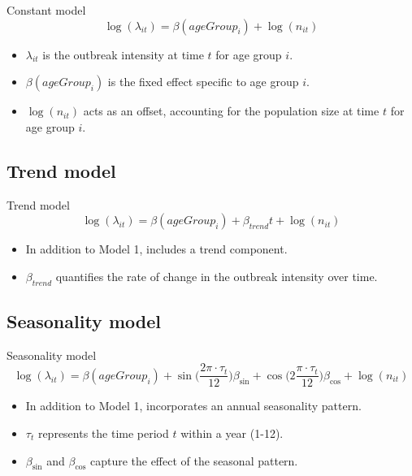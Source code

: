 \documentclass[aspectratio=169]{beamer}
\begin{document}
\begin{frame}{Constant model}
\begin{equation}\label{eq:Agegroup}
  \log(\lambda_{it}) = \beta(ageGroup_{i}) + \log(n_{it})
\end{equation}

\begin{itemize}
  \item $\lambda_{it}$ is the outbreak intensity at time $t$ for age group $i$.
  \item $\beta(ageGroup_{i})$ is the fixed effect specific to age group $i$.
  \item $\log(n_{it})$ acts as an offset, accounting for the population size at time $t$ for age group $i$.
\end{itemize}
\end{frame}

\hypertarget{trend-model}{%
\subsection{Trend model}\label{trend-model}}

\begin{frame}{Trend model}
\begin{equation}
  \log(\lambda_{it})=\beta(ageGroup_{i}) + \beta_{trend} t + \log(n_{it})
\end{equation}

\begin{itemize}
  \item In addition to Model 1, includes a trend component.
  \item $\beta_{trend}$ quantifies the rate of change in the outbreak intensity over time.
\end{itemize}
\end{frame}

\hypertarget{seasonality-model}{%
\subsection{Seasonality model}\label{seasonality-model}}

\begin{frame}{Seasonality model}
\begin{equation}
\log(\lambda_{it})=\beta(ageGroup_{i})+ \sin \big(\frac{2\pi\cdot \tau_t}{12}\big) \beta_{\sin} + \cos \big(2\frac{\pi\cdot \tau_t}{12}\big) \beta_{\cos} + \log(n_{it})
\end{equation}

\begin{itemize}
  \item In addition to Model 1, incorporates an annual seasonality pattern.
  \item $\tau_t$ represents the time period $t$ within a year (1-12).
  \item $\beta_{\sin}$ and $\beta_{\cos}$ capture the effect of the seasonal pattern.
\end{itemize}
\end{frame}
\end{document}

